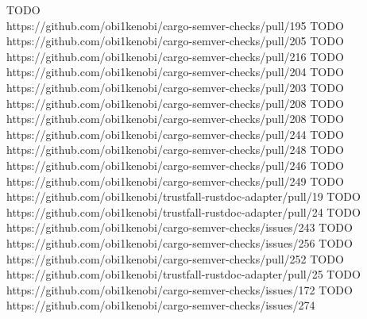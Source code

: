 \documentclass[licencjacka,en]{pracamgr}
\begin{document}
\begin{thebibliography}{99}
 TODO \\ https://github.com/obi1kenobi/cargo-semver-checks/pull/195
 TODO \\ https://github.com/obi1kenobi/cargo-semver-checks/pull/205
 TODO \\ https://github.com/obi1kenobi/cargo-semver-checks/pull/216
 TODO \\ https://github.com/obi1kenobi/cargo-semver-checks/pull/204
 TODO \\ https://github.com/obi1kenobi/cargo-semver-checks/pull/203
 TODO \\ https://github.com/obi1kenobi/cargo-semver-checks/pull/208
 TODO \\ https://github.com/obi1kenobi/cargo-semver-checks/pull/208
 TODO \\ https://github.com/obi1kenobi/cargo-semver-checks/pull/244
 TODO \\ https://github.com/obi1kenobi/cargo-semver-checks/pull/248
 TODO \\ https://github.com/obi1kenobi/cargo-semver-checks/pull/246
 TODO \\ https://github.com/obi1kenobi/cargo-semver-checks/pull/249
 TODO \\ https://github.com/obi1kenobi/trustfall-rustdoc-adapter/pull/19
 TODO \\ https://github.com/obi1kenobi/trustfall-rustdoc-adapter/pull/24
 TODO \\ https://github.com/obi1kenobi/cargo-semver-checks/issues/243
 TODO \\ https://github.com/obi1kenobi/cargo-semver-checks/issues/256
 TODO \\ https://github.com/obi1kenobi/cargo-semver-checks/pull/252
 TODO \\ https://github.com/obi1kenobi/trustfall-rustdoc-adapter/pull/25
 TODO \\ https://github.com/obi1kenobi/cargo-semver-checks/issues/172
 TODO \\ https://github.com/obi1kenobi/cargo-semver-checks/issues/274

\end{thebibliography}
\end{document}
